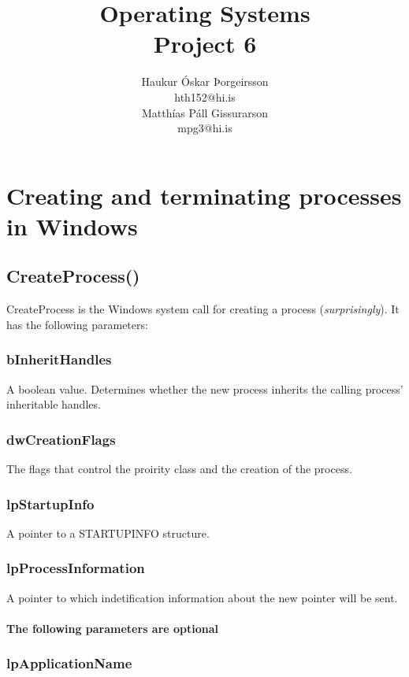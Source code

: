 \documentclass[a4]{article}
\title{
    Operating Systems\\
    Project 6
}
\author{
    Haukur Óskar Þorgeirsson\\
    hth152@hi.is\\
    Matthías Páll Gissurarson\\
    mpg3@hi.is
}
\begin{document}
\maketitle

\section{Creating and terminating processes in Windows}

\subsection*{CreateProcess()}

CreateProcess is the Windows system call for creating a process (\emph{surprisingly}). It has the following parameters:

\subsubsection*{bInheritHandles}

A boolean value. Determines whether the new process inherits the calling process' inheritable handles.

\subsubsection*{dwCreationFlags}

The flags that control the proirity class and the creation of the process.

\subsubsection*{lpStartupInfo}

A pointer to a STARTUPINFO structure.

\subsubsection*{lpProcessInformation}

A pointer to which indetification information about the new pointer will be sent.\\\\

\textbf{The following parameters are optional}

\subsubsection*{lpApplicationName}
\end{document}
